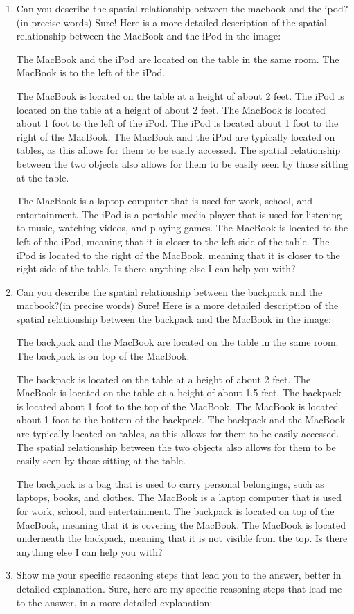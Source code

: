 \begin{enumerate}
    \item Can you describe the spatial relationship between the macbook and the ipod?(in precise words)
    \subitem 
    Sure! Here is a more detailed description of the spatial relationship between the MacBook and the iPod in the image:
    
    The MacBook and the iPod are located on the table in the same room. The MacBook is to the left of the iPod.
    
    The MacBook is located on the table at a height of about 2 feet.
    The iPod is located on the table at a height of about 2 feet.
    The MacBook is located about 1 foot to the left of the iPod.
    The iPod is located about 1 foot to the right of the MacBook.
    The MacBook and the iPod are typically located on tables, as this allows for them to be easily accessed. The spatial relationship between the two objects also allows for them to be easily seen by those sitting at the table.
    
    The MacBook is a laptop computer that is used for work, school, and entertainment.
    The iPod is a portable media player that is used for listening to music, watching videos, and playing games.
    The MacBook is located to the left of the iPod, meaning that it is closer to the left side of the table.
    The iPod is located to the right of the MacBook, meaning that it is closer to the right side of the table.
    Is there anything else I can help you with?
    \item Can you describe the spatial relationship between the backpack and the macbook?(in precise words)
    \subitem Sure! Here is a more detailed description of the spatial relationship between the backpack and the MacBook in the image:

    The backpack and the MacBook are located on the table in the same room. The backpack is on top of the MacBook.
    
    The backpack is located on the table at a height of about 2 feet.
    The MacBook is located on the table at a height of about 1.5 feet.
    The backpack is located about 1 foot to the top of the MacBook.
    The MacBook is located about 1 foot to the bottom of the backpack.
    The backpack and the MacBook are typically located on tables, as this allows for them to be easily accessed. The spatial relationship between the two objects also allows for them to be easily seen by those sitting at the table.
    
    The backpack is a bag that is used to carry personal belongings, such as laptops, books, and clothes.
    The MacBook is a laptop computer that is used for work, school, and entertainment.
    The backpack is located on top of the MacBook, meaning that it is covering the MacBook.
    The MacBook is located underneath the backpack, meaning that it is not visible from the top.
    Is there anything else I can help you with?
    \item Show me your specific reasoning steps that lead you to the answer, better in detailed explanation.
    \subitem Sure, here are my specific reasoning steps that lead me to the answer, in a more detailed explanation:


\end{enumerate}
